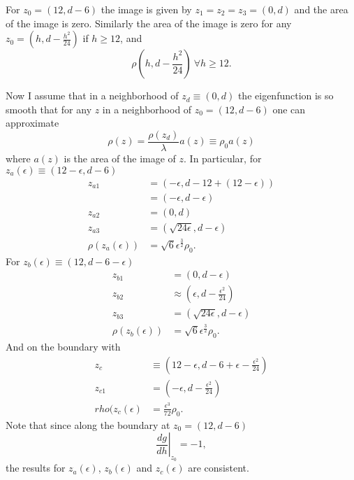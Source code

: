 \documentclass[twocolumn]{article}
\begin{document}
For $z_0 = (12, d-6)$ the image is given by $z_1 = z_2 = z_3 = (0,d)$
and the area of the image is zero.  Similarly the area of the image is
zero for any $z_0 = (h, d - \frac{h^2}{24})$ if $h \geq 12$, and
\begin{equation}
  \label{eq:zip}
  \rho(h, d - \frac{h^2}{24})~\forall h \geq 12.
\end{equation}

Now I assume that in a neighborhood of $z_d \equiv (0,d)$ the
eigenfunction is so smooth that for any $z$ in a neighborhood of $z_0
= (12,d-6)$ one can approximate
\begin{equation*}
  \rho(z) = \frac{\rho(z_d)}{\lambda} a(z) \equiv \rho_0  a(z)
\end{equation*}
where $a(z)$ is the area of the image of $z$.  In particular, for
$z_a(\epsilon) \equiv (12-\epsilon, d-6)$
\begin{align*}
  z_{a1} &= (-\epsilon, d - 12 + (12-\epsilon)) \\
  &= (-\epsilon, d - \epsilon) \\
  z_{a2} &= (0,d) \\
  z_{a3} &= (\sqrt{24 \epsilon}, d - \epsilon) \\
  \rho(z_a(\epsilon)) &= \sqrt{6} \epsilon^{\frac{3}{2}}\rho_0.
\end{align*}
For $z_b(\epsilon) \equiv (12, d-6-\epsilon)$
\begin{align*}
  z_{b1} &= (0,d-\epsilon) \\
  z_{b2} &\approx (\epsilon ,d - \frac{\epsilon^2}{24}) \\
  z_{b3} &= (\sqrt{24 \epsilon}, d - \epsilon) \\
  \rho(z_b(\epsilon)) &= \sqrt{6} \epsilon^{\frac{3}{2}}\rho_0.
\end{align*}
And on the boundary with
\begin{align*}
  z_c & \equiv \left(12 - \epsilon , d - 6 + \epsilon -
  \frac{\epsilon^2}{24} \right) \\
  z_{c1} &= \left( -\epsilon, d - \frac{\epsilon^2}{24} \right) \\
  rho(z_c(\epsilon) & = \frac{\epsilon^3}{72} \rho_0.
\end{align*}
Note that since along the boundary at $z_0 = (12, d-6)$
\begin{equation*}
  \left. \frac{dg}{dh} \right|_{z_0} = -1,
\end{equation*}
the results for $z_a(\epsilon)$, $z_b(\epsilon)$ and $z_c(\epsilon)$
are consistent.
\end{document}
